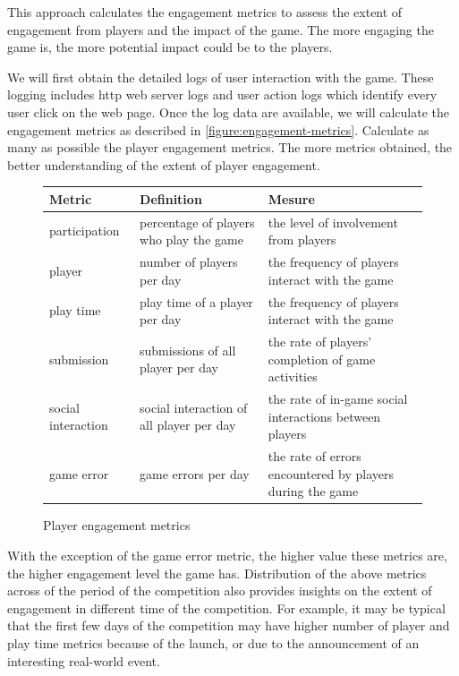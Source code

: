 \documentclass[11pt,oneside]{book}
\newcommand\tabhead[1]{\small\textbf{#1}}
\begin{document}
This approach calculates the engagement metrics to assess the extent of engagement from players and the impact of the game. The more engaging the game is, the more potential impact could be to the players.

We will first obtain the detailed logs of user interaction with the game. These logging includes http web server logs and user action logs which identify every user click on the web page. Once the log data are available, we will calculate the engagement metrics as described in \autoref{figure:engagement-metrics}. Calculate as many as possible the player engagement metrics. The more metrics obtained, the better understanding of the extent of player engagement.

\begin{figure}[ht!]
  \centering
    \begin{tabular}{|p{}|p{}|p{}|}
    \hline
    \tabhead{Metric} &
    \tabhead{Definition} &
    \tabhead{Mesure} \\
    \hline
    participation &
    percentage of players who play the game &
    the level of involvement from players \\
    \hline
    player &
    number of players per day &
    the frequency of players interact with the game \\
    \hline
    play time &
    play time of a player per day &
    the frequency of players interact with the game \\
    \hline
    submission &
    submissions of all player per day &
    the rate of players' completion of game activities \\
    \hline
    social interaction &
    social interaction of all player per day &
    the rate of in-game social interactions between players\\
    \hline
    game error &
    game errors per day &
    the rate of errors encountered by players during the game \\
    \hline
  \end{tabular}
  \caption{Player engagement metrics}
  \label{figure:engagement-metrics}
\end{figure}

With the exception of the game error metric, the higher value these metrics are, the higher engagement level the game has. 
Distribution of the above metrics across of the period of the competition also provides insights on 
the extent of engagement in different time of the competition. For example, it may be typical that
the first few days of the competition may have higher number of player and play time metrics because 
of the launch, or due to the announcement of an interesting real-world event. 
\end{document}
